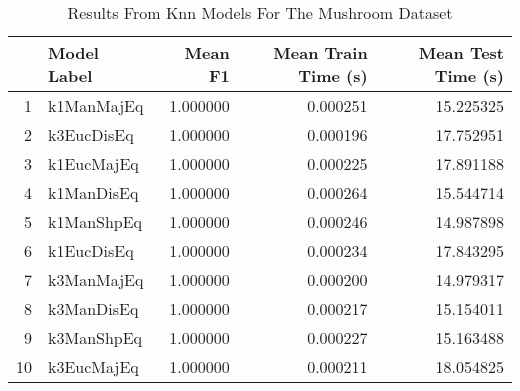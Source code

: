 \begin{table}[!htbp]
\centering
\caption{Results From Knn Models For The Mushroom Dataset}
\label{tab:knn_results_mushroom}
\begin{tabular}{rlrrr}
\toprule
 & Model Label & Mean F1 & Mean Train Time (s) & Mean Test Time (s) \\
\midrule
1 & k1ManMajEq & 1.000000 & 0.000251 & 15.225325 \\
2 & k3EucDisEq & 1.000000 & 0.000196 & 17.752951 \\
3 & k1EucMajEq & 1.000000 & 0.000225 & 17.891188 \\
4 & k1ManDisEq & 1.000000 & 0.000264 & 15.544714 \\
5 & k1ManShpEq & 1.000000 & 0.000246 & 14.987898 \\
6 & k1EucDisEq & 1.000000 & 0.000234 & 17.843295 \\
7 & k3ManMajEq & 1.000000 & 0.000200 & 14.979317 \\
8 & k3ManDisEq & 1.000000 & 0.000217 & 15.154011 \\
9 & k3ManShpEq & 1.000000 & 0.000227 & 15.163488 \\
10 & k3EucMajEq & 1.000000 & 0.000211 & 18.054825 \\
\bottomrule
\end{tabular}
\end{table}
